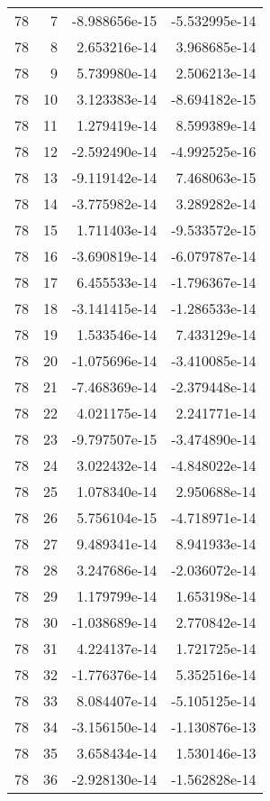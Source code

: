 \begin{tabular}{rrrr}
  78 &    7 & -8.988656e-15 & -5.532995e-14 \\
  78 &    8 &  2.653216e-14 &  3.968685e-14 \\
  78 &    9 &  5.739980e-14 &  2.506213e-14 \\
  78 &   10 &  3.123383e-14 & -8.694182e-15 \\
  78 &   11 &  1.279419e-14 &  8.599389e-14 \\
  78 &   12 & -2.592490e-14 & -4.992525e-16 \\
  78 &   13 & -9.119142e-14 &  7.468063e-15 \\
  78 &   14 & -3.775982e-14 &  3.289282e-14 \\
  78 &   15 &  1.711403e-14 & -9.533572e-15 \\
  78 &   16 & -3.690819e-14 & -6.079787e-14 \\
  78 &   17 &  6.455533e-14 & -1.796367e-14 \\
  78 &   18 & -3.141415e-14 & -1.286533e-14 \\
  78 &   19 &  1.533546e-14 &  7.433129e-14 \\
  78 &   20 & -1.075696e-14 & -3.410085e-14 \\
  78 &   21 & -7.468369e-14 & -2.379448e-14 \\
  78 &   22 &  4.021175e-14 &  2.241771e-14 \\
  78 &   23 & -9.797507e-15 & -3.474890e-14 \\
  78 &   24 &  3.022432e-14 & -4.848022e-14 \\
  78 &   25 &  1.078340e-14 &  2.950688e-14 \\
  78 &   26 &  5.756104e-15 & -4.718971e-14 \\
  78 &   27 &  9.489341e-14 &  8.941933e-14 \\
  78 &   28 &  3.247686e-14 & -2.036072e-14 \\
  78 &   29 &  1.179799e-14 &  1.653198e-14 \\
  78 &   30 & -1.038689e-14 &  2.770842e-14 \\
  78 &   31 &  4.224137e-14 &  1.721725e-14 \\
  78 &   32 & -1.776376e-14 &  5.352516e-14 \\
  78 &   33 &  8.084407e-14 & -5.105125e-14 \\
  78 &   34 & -3.156150e-14 & -1.130876e-13 \\
  78 &   35 &  3.658434e-14 &  1.530146e-13 \\
  78 &   36 & -2.928130e-14 & -1.562828e-14 \\

\end{tabular}
